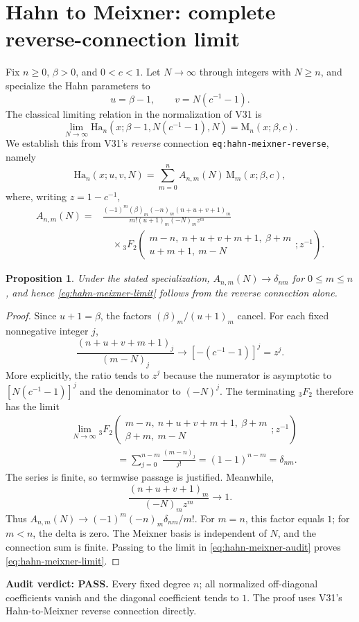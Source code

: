 \documentclass[11pt]{article}
\newtheorem{proposition}{Proposition}
\begin{document}
\section{Hahn to Meixner: complete reverse-connection limit}
Fix $n\geq0$, $\beta>0$, and $0<c<1$. Let $N\to\infty$ through
integers with $N\geq n$, and specialize the Hahn parameters to
\[
 u=\beta-1,\qquad v=N(c^{-1}-1).
\]
The classical limiting relation in the normalization of V31 is
\begin{equation}\label{eq:hahn-meixner-limit}
 \lim_{N\to\infty}\mathrm{Ha}_n(x;\beta-1,N(c^{-1}-1),N)
 =\mathrm M_n(x;\beta,c).
\end{equation}
We establish this from V31's \emph{reverse} connection
\texttt{eq:hahn-meixner-reverse}, namely
\begin{equation}\label{eq:hahn-meixner-audit}
\mathrm{Ha}_n(x;u,v,N)=\sum_{m=0}^n A_{n,m}(N)\,\mathrm M_m(x;\beta,c),
\end{equation}
where, writing $z=1-c^{-1}$,
\begin{align*}
 A_{n,m}(N)={}&
 \frac{(-1)^m(\beta)_m(-n)_m(n+u+v+1)_m}
 {m!(u+1)_m(-N)_m z^m}\\[-2pt]
 &\quad\times{}_3F_2\!\left(\begin{matrix}
 m-n,\ n+u+v+m+1,\ \beta+m\\
 u+m+1,\ m-N
 \end{matrix};z^{-1}\right).
\end{align*}
\begin{proposition}
Under the stated specialization, $A_{n,m}(N)\to\delta_{nm}$ for
$0\leq m\leq n$, and hence \eqref{eq:hahn-meixner-limit} follows
from the reverse connection alone.
\end{proposition}
\begin{proof}
Since $u+1=\beta$, the factors $(\beta)_m/(u+1)_m$ cancel.
For each fixed nonnegative integer $j$,
\[
 \frac{(n+u+v+m+1)_j}{(m-N)_j}
 \longrightarrow [-(c^{-1}-1)]^j=z^j.
\]
More explicitly, the ratio tends to $z^j$ because the numerator
is asymptotic to $[N(c^{-1}-1)]^j$ and the denominator to $(-N)^j$.
The terminating ${}_3F_2$ therefore has the limit
\begin{align*}
 &\lim_{N\to\infty}{}_3F_2\!\left(\begin{matrix}
 m-n,\ n+u+v+m+1,\ \beta+m\\
 \beta+m,\ m-N
 \end{matrix};z^{-1}\right)\\
 &\hspace{2cm}=\sum_{j=0}^{n-m}\frac{(m-n)_j}{j!}
 = (1-1)^{n-m}=\delta_{nm}.
\end{align*}
The series is finite, so termwise passage is justified. Meanwhile,
\[
 \frac{(n+u+v+1)_m}{(-N)_m z^m}\longrightarrow1.
\]
Thus $A_{n,m}(N)\to(-1)^m(-n)_m\delta_{nm}/m!$.
For $m=n$, this factor equals $1$; for $m<n$, the delta is zero.
The Meixner basis is independent of $N$, and the connection sum is
finite. Passing to the limit in \eqref{eq:hahn-meixner-audit}
proves \eqref{eq:hahn-meixner-limit}.
\end{proof}
\noindent\textbf{Audit verdict: PASS.} Every fixed degree $n$;
all normalized off-diagonal coefficients vanish and the diagonal
coefficient tends to $1$. The proof uses V31's Hahn-to-Meixner
reverse connection directly.
\end{document}
